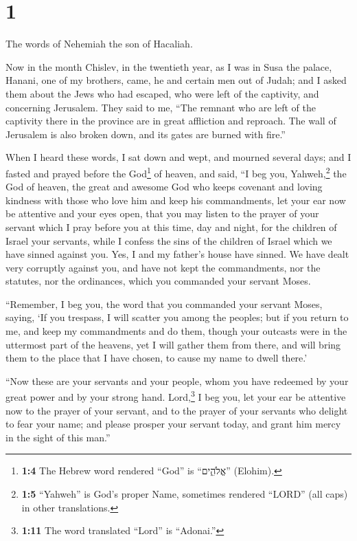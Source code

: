 \hypertarget{section}{%
\section{1}\label{section}}

 The words of Nehemiah the son of Hacaliah.

Now in the month Chislev, in the twentieth year, as I was in Susa the
palace,  Hanani, one of my brothers, came, he and certain
men out of Judah; and I asked them about the Jews who had escaped, who
were left of the captivity, and concerning Jerusalem. 
They said to me, ``The remnant who are left of the captivity there in
the province are in great affliction and reproach. The wall of Jerusalem
is also broken down, and its gates are burned with fire.''

 When I heard these words, I sat down and wept, and
mourned several days; and I fasted and prayed before the God\footnote{\textbf{1:4}
  The Hebrew word rendered ``God'' is ``אֱלֹהִ֑ים'' (Elohim).} of
heaven,  and said, ``I beg you, Yahweh,\footnote{\textbf{1:5}
  ``Yahweh'' is God's proper Name, sometimes rendered ``LORD'' (all
  caps) in other translations.} the God of heaven, the great and awesome
God who keeps covenant and loving kindness with those who love him and
keep his commandments,  let your ear now be attentive and
your eyes open, that you may listen to the prayer of your servant which
I pray before you at this time, day and night, for the children of
Israel your servants, while I confess the sins of the children of Israel
which we have sinned against you. Yes, I and my father's house have
sinned.  We have dealt very corruptly against you, and
have not kept the commandments, nor the statutes, nor the ordinances,
which you commanded your servant Moses.

 ``Remember, I beg you, the word that you commanded your
servant Moses, saying, `If you trespass, I will scatter you among the
peoples;  but if you return to me, and keep my
commandments and do them, though your outcasts were in the uttermost
part of the heavens, yet I will gather them from there, and will bring
them to the place that I have chosen, to cause my name to dwell there.'

 ``Now these are your servants and your people, whom you
have redeemed by your great power and by your strong hand.
 Lord,\footnote{\textbf{1:11} The word translated
  ``Lord'' is ``Adonai.''} I beg you, let your ear be attentive now to
the prayer of your servant, and to the prayer of your servants who
delight to fear your name; and please prosper your servant today, and
grant him mercy in the sight of this man.''

